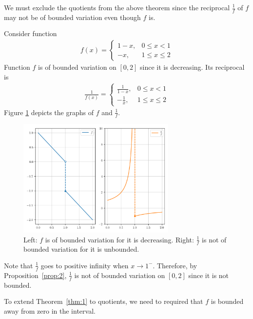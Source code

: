 \documentclass[thmcnt=section, color=blue, 12pt]{my-elegantbook}
\begin{document}
We must exclude the quotients from the above theorem
since the reciprocal $\frac{1}{f}$ of $f$ may not be of bounded variation
even though $f$ is.

\begin{example}
	Consider function
	\begin{align*}
		f(x) = \begin{cases}
			       1-x, & 0 \leq x < 1     \\
			       -x,  & 1 \leq x  \leq 2
		       \end{cases}
	\end{align*}
	Function $f$ is of bounded variation on $[0, 2]$ since it is decreasing.
	Its reciprocal is
	\begin{align*}
		\frac{1}{f(x)} = \begin{cases}
			                 \frac{1}{1-x}, & 0 \leq x < 1     \\
			                 -\frac{1}{x},  & 1 \leq x  \leq 2
		                 \end{cases}
	\end{align*}
	Figure \ref{fig:3} depicts the graphs of $f$ and $\frac{1}{f}$.
	\begin{figure}[H]
		\centering
		\includegraphics[width=0.7\textwidth]{figures/reciprocal-not-of-bounded-variation.png}
		\caption{Left: $f$ is of bounded variation for it is decreasing. Right: $\frac{1}{f}$ is not of bounded variation for it is unbounded.}
		\label{fig:3}
	\end{figure}
	Note that $\frac{1}{f}$ goes to positive infinity when $x \to 1^-$.
	Therefore, by Proposition~\ref{prop:2}, $\frac{1}{f}$ is not of bounded variation on $[0, 2]$
	since it is not bounded.
\end{example}

To extend Theorem~\ref{thm:1} to quotients,
we need to required that $f$ is bounded away from zero in the interval.
\end{document}
